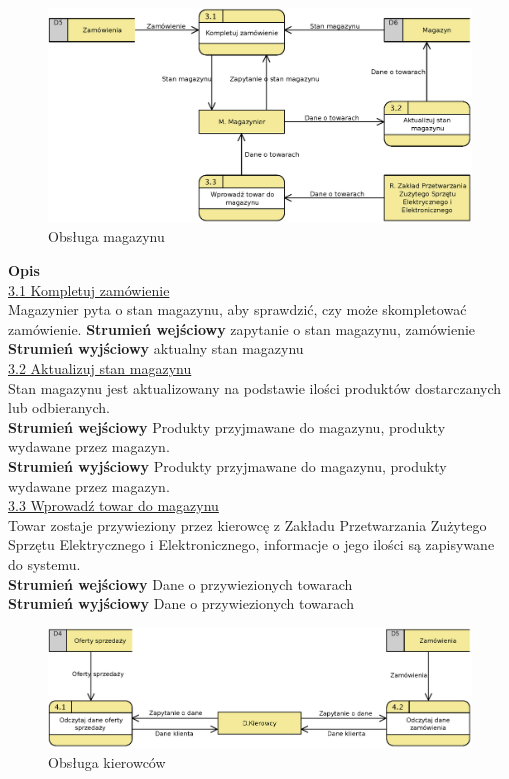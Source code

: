 	\begin{figure}[H]
		\centering
		\centerline{\includegraphics[width=1.1\textwidth]{img/DFD/2-level-magazyn.eps}}
		\caption{Obsługa magazynu}
	\end{figure}

	\textbf{Opis} \\
	\underline{3.1 Kompletuj zamówienie}\\
	Magazynier pyta o stan magazynu, aby sprawdzić, czy może skompletować zamówienie.
	\textbf{Strumień wejściowy} zapytanie o stan magazynu, zamówienie\\
	\textbf{Strumień wyjściowy} aktualny stan magazynu\\

	\underline{3.2 Aktualizuj stan magazynu}\\ 
	Stan magazynu jest aktualizowany na podstawie ilości produktów dostarczanych lub odbieranych.\\	
	\textbf{Strumień wejściowy} Produkty przyjmawane do magazynu, produkty wydawane przez magazyn.\\
	\textbf{Strumień wyjściowy} Produkty przyjmawane do magazynu, produkty wydawane przez magazyn.\\
	\underline{3.3 Wprowadź towar do magazynu}\\
	Towar zostaje przywieziony przez kierowcę z Zakładu Przetwarzania Zużytego Sprzętu Elektrycznego i Elektronicznego, informacje o jego ilości są zapisywane do systemu.\\
	\textbf{Strumień wejściowy} Dane o przywiezionych towarach\\
	\textbf{Strumień wyjściowy} Dane o przywiezionych towarach

	\begin{figure}[H]
		\centering
		\centerline{\includegraphics[width=1.1\textwidth]{img/DFD/2-level-kierowcy.eps}}
		\caption{Obsługa kierowców}
	\end{figure}


